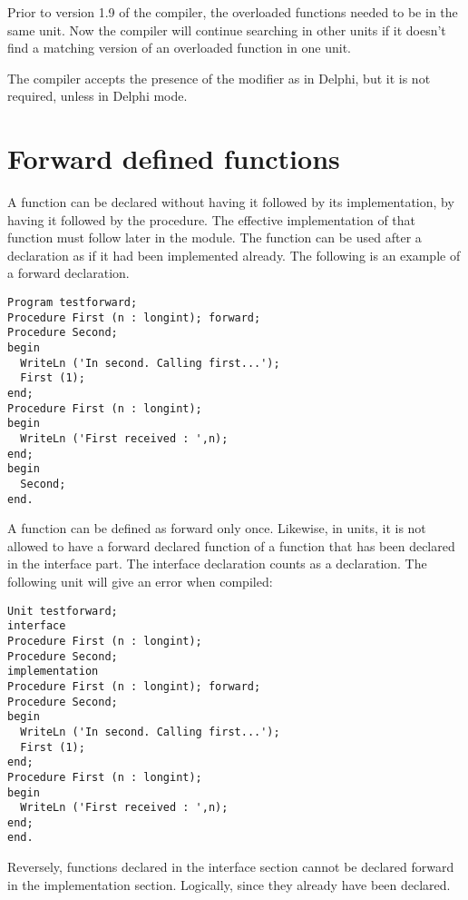 Prior to version 1.9 of the compiler, the overloaded functions needed to be
in the same unit. Now the compiler will continue searching in other units if
it doesn't find a matching version of an overloaded function in one unit.

The compiler accepts the presence of the  modifier as in
Delphi, but it is not required, unless in Delphi mode.

\section{Forward defined functions}
A function can be declared without having it followed by its implementation,
by having it followed by the  procedure. The effective
implementation of that function must follow later in the module.
The function can be used after a  declaration as if it had been
implemented already.
The following is an example of a forward declaration.
\begin{verbatim}
Program testforward;
Procedure First (n : longint); forward;
Procedure Second;
begin
  WriteLn ('In second. Calling first...');
  First (1);
end;
Procedure First (n : longint);
begin
  WriteLn ('First received : ',n);
end;
begin
  Second;
end.
\end{verbatim}
A function can be defined as forward only once.
Likewise, in units, it is not allowed to have a forward declared function
of a function that has been declared in the interface part. The interface
declaration counts as a  declaration.
The following unit will give an error when compiled:
\begin{verbatim}
Unit testforward;
interface
Procedure First (n : longint);
Procedure Second;
implementation
Procedure First (n : longint); forward;
Procedure Second;
begin
  WriteLn ('In second. Calling first...');
  First (1);
end;
Procedure First (n : longint);
begin
  WriteLn ('First received : ',n);
end;
end.
\end{verbatim}
Reversely, functions declared in the interface section cannot be declared
forward in the implementation section. Logically, since they already have
been declared.

